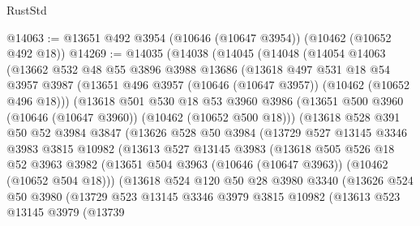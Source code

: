 \begin{lexlean}{RustStd}
\begin{coremodule}
@14063 := @13651 @492 @3954 (@10646 (@10647 @3954)) (@10462 (@10652 @492 @18))
@14269 := @14035
    (@14038
      (@14045
        (@14048
          (@14054
            @14063
            (@13662
              @532
              @48
              @55
              @3896
              @3988
              @13686
              (@13618
                @497
                @531
                @18
                @54
                @3957
                @3987
                (@13651 @496 @3957 (@10646 (@10647 @3957)) (@10462 (@10652 @496 @18)))
                (@13618
                  @501
                  @530
                  @18
                  @53
                  @3960
                  @3986
                  (@13651 @500 @3960 (@10646 (@10647 @3960)) (@10462 (@10652 @500 @18)))
                  (@13618
                    @528
                    @391
                    @50
                    @52
                    @3984
                    @3847
                    (@13626
                      @528
                      @50
                      @3984
                      (@13729
                        @527
                        @13145
                        @3346
                        @3983
                        @3815
                        @10982
                        (@13613
                          @527
                          @13145
                          @3983
                          (@13618
                            @505
                            @526
                            @18
                            @52
                            @3963
                            @3982
                            (@13651 @504 @3963 (@10646 (@10647 @3963)) (@10462 (@10652 @504 @18)))
                            (@13618
                              @524
                              @120
                              @50
                              @28
                              @3980
                              @3340
                              (@13626
                                @524
                                @50
                                @3980
                                (@13729
                                  @523
                                  @13145
                                  @3346
                                  @3979
                                  @3815
                                  @10982
                                  (@13613
                                    @523
                                    @13145
                                    @3979
                                    (@13739

\end{coremodule}
\end{lexlean}
